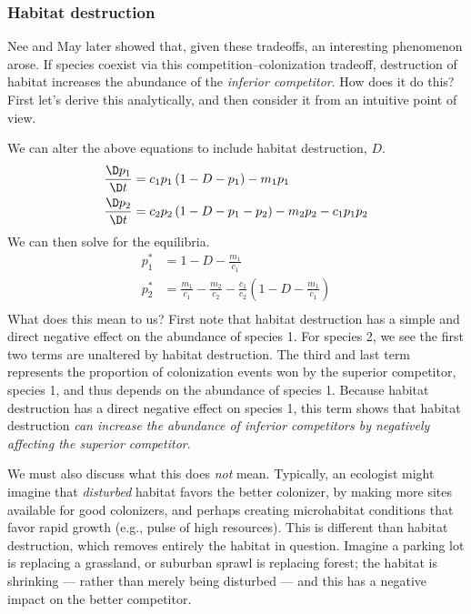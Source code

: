 \subsubsection{Habitat destruction}
Nee and May \cite{Nee:1992vn} later showed that, given these tradeoffs, an interesting phenomenon arose. If species coexist via this competition--colonization tradeoff, destruction of habitat increases the abundance of the \emph{inferior competitor}. How does it do this? First let's derive this analytically, and then consider it from an intuitive point of view.

We can alter the above equations to include habitat destruction, $D$.
\begin{align*}
  \frac{\D p_1}{\D t} &= c_1p_1\left(1-D-p_1\right) - m_1p_1\\
  \frac{\D p_2}{\D t} &= c_2p_2\left(1-D-p_1 - p_2\right) - m_2p_2 - c_1p_1p_2
\end{align*}
We can then solve for the equilibria. 
\begin{align}
  \label{eq:9}
    p_1^*&= 1 - D - \frac{m_1}{c_1}\\   
  p_2^* &= \frac{m_1}{c_1}  - \frac{m_2}{c_2} - \frac{c_1}{c_2}\left(1 - D - \frac{m_1}{c_1}\right)\\
\end{align}
What does this mean to us? First note that habitat destruction has a simple and direct negative effect on the abundance of species 1. For species 2, we see the first two terms are unaltered by habitat destruction. The third and last term represents the proportion of colonization events won by the superior competitor, species 1, and thus depends on the abundance of species 1. Because habitat destruction has a direct negative effect on species 1, this term shows that habitat destruction \emph{can increase the abundance of inferior competitors by negatively affecting the superior competitor}. 

We must also discuss what this does \emph{not} mean. Typically, an ecologist might imagine that \emph{disturbed} habitat favors the better colonizer, by making more sites available for good colonizers, and perhaps creating microhabitat conditions that favor rapid growth (e.g., pulse of high resources). This is different than habitat destruction, which  removes entirely the habitat in question. Imagine a parking lot is replacing a grassland, or suburban sprawl is replacing forest; the habitat is shrinking ---  rather than merely being disturbed --- and this has a negative impact on the better competitor.


